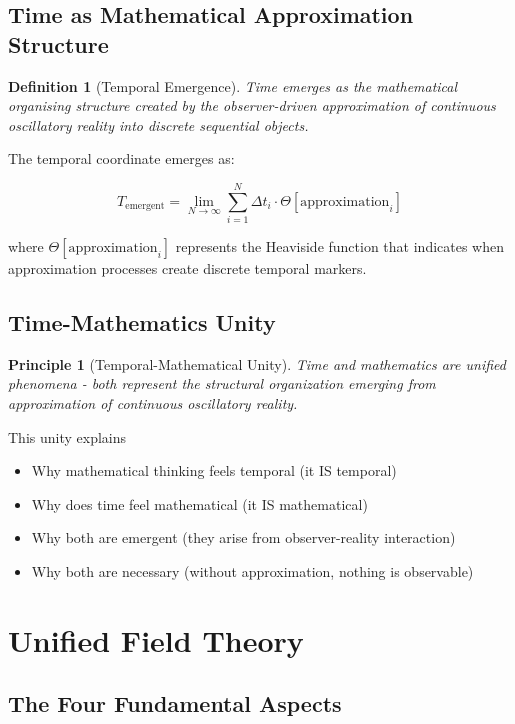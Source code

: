 \documentclass[11pt]{article}
\newtheorem{definition}[theorem]{Definition}
\newtheorem{principle}[theorem]{Principle}
\theoremstyle{remark}
\begin{document}
\subsection{Time as Mathematical Approximation Structure}

\begin{definition}[Temporal Emergence]
Time emerges as the mathematical organising structure created by the observer-driven approximation of continuous oscillatory reality into discrete sequential objects.
\end{definition}

The temporal coordinate emerges as:

$$T_{\text{emergent}} = \lim_{N \to \infty} \sum_{i=1}^{N} \Delta t_i \cdot \Theta[\text{approximation}_i]$$

where $\Theta[\text{approximation}_i]$ represents the Heaviside function that indicates when approximation processes create discrete temporal markers.

\subsection{Time-Mathematics Unity}

\begin{principle}[Temporal-Mathematical Unity]
Time and mathematics are unified phenomena - both represent the structural organization emerging from approximation of continuous oscillatory reality.
\end{principle}

This unity explains
\begin{itemize}
\item Why mathematical thinking feels temporal (it IS temporal)
\item Why does time feel mathematical (it IS mathematical)
\item Why both are emergent (they arise from observer-reality interaction)
\item Why both are necessary (without approximation, nothing is observable)
\end{itemize}

\section{Unified Field Theory}

\subsection{The Four Fundamental Aspects}
\end{document}
